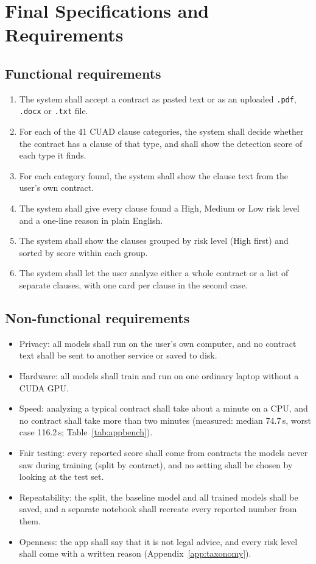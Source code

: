 \section{Final Specifications and Requirements}
\subsection{Functional requirements}
\begin{enumerate}[label=\textbf{FR\arabic*}, itemsep=2pt, leftmargin=1.4cm]
  \item The system shall accept a contract as pasted text or as an uploaded \texttt{.pdf}, \texttt{.docx} or \texttt{.txt} file.
  \item For each of the 41 CUAD clause categories, the system shall decide whether the contract has a clause of that type, and shall show the detection score of each type it finds.
  \item For each category found, the system shall show the clause text from the user's own contract.
  \item The system shall give every clause found a High, Medium or Low risk level and a one-line reason in plain English.
  \item The system shall show the clauses grouped by risk level (High first) and sorted by score within each group.
  \item The system shall let the user analyze either a whole contract or a list of separate clauses, with one card per clause in the second case.
\end{enumerate}

\subsection{Non-functional requirements}
\begin{itemize}[itemsep=2pt]
  \item Privacy: all models shall run on the user's own computer, and no contract text shall be sent to another service or saved to disk.
  \item Hardware: all models shall train and run on one ordinary laptop without a CUDA GPU.
  \item Speed: analyzing a typical contract shall take about a minute on a CPU, and no contract shall take more than two minutes (measured: median 74.7\,s, worst case 116.2\,s; Table~\ref{tab:appbench}).
  \item Fair testing: every reported score shall come from contracts the models never saw during training (split by contract), and no setting shall be chosen by looking at the test set.
  \item Repeatability: the split, the baseline model and all trained models shall be saved, and a separate notebook shall recreate every reported number from them.
  \item Openness: the app shall say that it is not legal advice, and every risk level shall come with a written reason (Appendix~\ref{app:taxonomy}).
\end{itemize}

